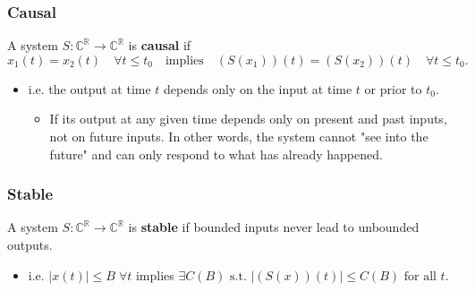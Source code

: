     \begin{example}
    \end{example}

    \subsubsection{Causal}
    \begin{definition}
        A system \( S: \mathbb{C}^{\mathbb{R}} \to \mathbb{C}^{\mathbb{R}} \) is \textbf{causal} if
        \[
        x_1(t) = x_2(t) \quad \forall t \leq t_0 \quad \text{implies} \quad (S(x_1))(t) = (S(x_2))(t) \quad \forall t \leq t_0.
        \]

        \begin{itemize}
            \item i.e. the output at time \( t \) depends only on the input at time \( t \) or prior to \( t_0 \).
            \begin{itemize}
                \item  If its output at any given time depends only on present and past inputs, not on future inputs. In other words, the system cannot "see into the future" and can only respond to what has already happened.
            \end{itemize}
        \end{itemize}
    \end{definition}

    \begin{example}
    \end{example}

    \subsubsection{Stable}
    \begin{definition}
        A system \( S: \mathbb{C}^{\mathbb{R}} \to \mathbb{C}^{\mathbb{R}} \) is \textbf{stable} if bounded inputs never lead to unbounded outputs.\\
        
        \begin{itemize}
            \item i.e. $|x(t)| \leq B \; \forall t$ implies $\exists C(B) \text{ s.t. } |(S(x))(t)| \leq C(B) \text{ for all } t.$
        \end{itemize}
    \end{definition}

